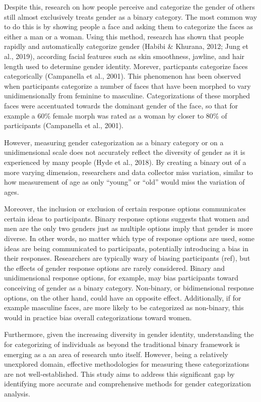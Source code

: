 \documentclass[
  man]{apa7}
\begin{document}
Despite this, research on how people perceive and categorize the gender of others still almost exclusively treats gender as a binary category. The most common way to do this is by showing people a face and asking them to categorize the faces as either a man or a woman. Using this method, research has shown that people rapidly and automatically categorize gender (Habibi \& Khurana, 2012; Jung et al., 2019), according facial features such as skin smoothness, jawline, and hair length used to determine gender identity. Morever, particpants categorize faces categorically (Campanella et al., 2001). This phenomenon has been observed when participants categorize a number of faces that have been morphed to vary unidimensionally from feminine to masculine. Categorizations of these morphed faces were accentuated towards the dominant gender of the face, so that for example a 60\% female morph was rated as a woman by closer to 80\% of participants (Campanella et al., 2001).

However, measuring gender categorization as a binary category or on a unidimensional scale does not accurately reflect the diversity of gender as it is experienced by many people (Hyde et al., 2018). By creating a binary out of a more varying dimension, researchers and data collector miss variation, similar to how measurement of age as only ``young'' or ``old'' would miss the variation of ages.

Moreover, the inclusion or exclusion of certain response options communicates certain ideas to participants. Binary response options suggests that women and men are the only two genders just as multiple options imply that gender is more diverse. In other words, no matter which type of response options are used, some ideas are being communicated to participants, potentially introducing a bias in their responses. Researchers are typically wary of biasing participants (ref), but the effects of gender response options are rarely considered. Binary and unidimensional response options, for example, may bias participants toward conceiving of gender as a binary category. Non-binary, or bidimensional response options, on the other hand, could have an opposite effect. Additionally, if for example masculine faces, are more likely to be categorized as non-binary, this would in practice bias overall categorizations toward women.

Furthermore, given the increasing diversity in gender identity, understanding the for categorizing of individuals as beyond the traditional binary framework is emerging as a an area of research unto itself. However, being a relatively unexplored domain, effective methodologies for measuring these categorizations are not well-established. This study aims to address this significant gap by identifying more accurate and comprehensive methods for gender categorization analysis.
\end{document}
